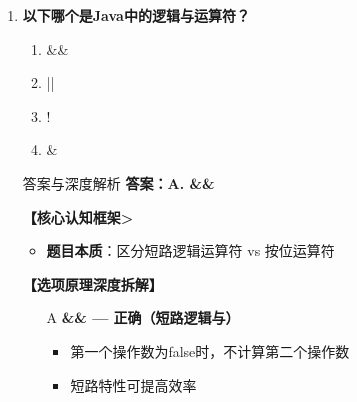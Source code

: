 \documentclass[12pt, a4paper]{ctexart}
\begin{document}
\begin{enumerate}[label=\textbf{\arabic*.}]
\begin{bluebox}{答案与深度解析}
\begin{itemize}[leftmargin=*, nosep, label={}]
			      \item[C] \textbf{3 — 错误（不是四舍五入）}
			      \begin{itemize}[label={}, nosep]
				      \item 四舍五入需要：Math.round(a * 1.0 / b)
			      \end{itemize}

			      \item[D] \textbf{2.0 — 错误（类型不会自动转换）}
			      \begin{itemize}[label={}, nosep]
				      \item int除int结果还是int
				      \item 不会自动转为double
			      \end{itemize}
		      \end{itemize}

		      \textbf{【应背诵知识点>}
		      \begin{itemize}[label={}, nosep]
			      \item 整数相除：截断小数部分（向零取整）
			      \item 取模：5 %
			      \item 浮点除法：至少一个操作数转为浮点类型
		      \end{itemize}
	      \end{bluebox}

	      \vspace{1em}

	\item \textbf{以下哪个是Java中的逻辑与运算符？}
	      \begin{enumerate}[label=\Alph*.]
		      \item \&\&
		      \item ||
		      \item !
		      \item \&
	      \end{enumerate}

	      \begin{bluebox}{答案与深度解析}
		      \textbf{答案：A. \&\&}

		      \textbf{【核心认知框架>}
		      \begin{itemize}[label={}, leftmargin=*, nosep]
			      \item \textbf{题目本质}：区分短路逻辑运算符 vs 按位运算符
		      \end{itemize}

		      \textbf{【选项原理深度拆解】}

		      \begin{itemize}[leftmargin=*, nosep, label={}]
			      \item[A] \textbf{\&\& — 正确（短路逻辑与）}
			      \begin{itemize}[label={}, nosep]
				      \item 第一个操作数为false时，不计算第二个操作数
				      \item 短路特性可提高效率
			      \end{itemize}


\end{itemize}
\end{bluebox}
\end{enumerate}
\end{document}
